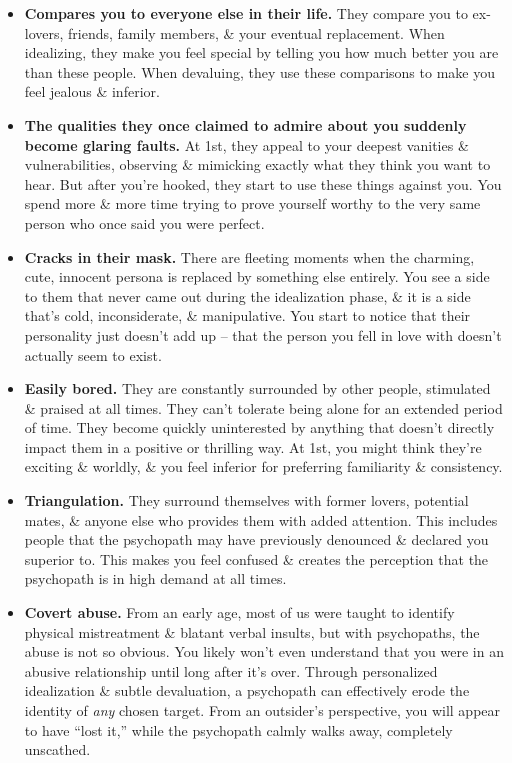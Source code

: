 \documentclass{article}
\numberwithin{equation}{section}
\begin{document}
\begin{itemize}
	\item \textbf{Compares you to everyone else in their life.} They compare you to ex-lovers, friends, family members, \& your eventual replacement. When idealizing, they make you feel special by telling you how much better you are than these people. When devaluing, they use these comparisons to make you feel jealous \& inferior.
	\item \textbf{The qualities they once claimed to admire about you suddenly become glaring faults.} At 1st, they appeal to your deepest vanities \& vulnerabilities, observing \& mimicking exactly what they think you want to hear. But after you're hooked, they start to use these things against you. You spend more \& more time trying to prove yourself worthy to the very same person who once said you were perfect.
	\item \textbf{Cracks in their mask.} There are fleeting moments when the charming, cute, innocent persona is replaced by something else entirely. You see a side to them that never came out during the idealization phase, \& it is a side that's cold, inconsiderate, \& manipulative. You start to notice that their personality just doesn't add up -- that the person you fell in love with doesn't actually seem to exist.
	\item \textbf{Easily bored.} They are constantly surrounded by other people, stimulated \& praised at all times. They can't tolerate being alone for an extended period of time. They become quickly uninterested by anything that doesn't directly impact them in a positive or thrilling way. At 1st, you might think they're exciting \& worldly, \& you feel inferior for preferring familiarity \& consistency.
	\item \textbf{Triangulation.} They surround themselves with former lovers, potential mates, \& anyone else who provides them with added attention. This includes people that the psychopath may have previously denounced \& declared you superior to. This makes you feel confused \& creates the perception that the psychopath is in high demand at all times.
	\item \textbf{Covert abuse.} From an early age, most of us were taught to identify physical mistreatment \& blatant verbal insults, but with psychopaths, the abuse is not so obvious. You likely won't even understand that you were in an abusive relationship until long after it's over. Through personalized idealization \& subtle devaluation, a psychopath can effectively erode the identity of \textit{any} chosen target. From an outsider's perspective, you will appear to have ``lost it,'' while the psychopath calmly walks away, completely unscathed.

\end{itemize}
\end{document}
